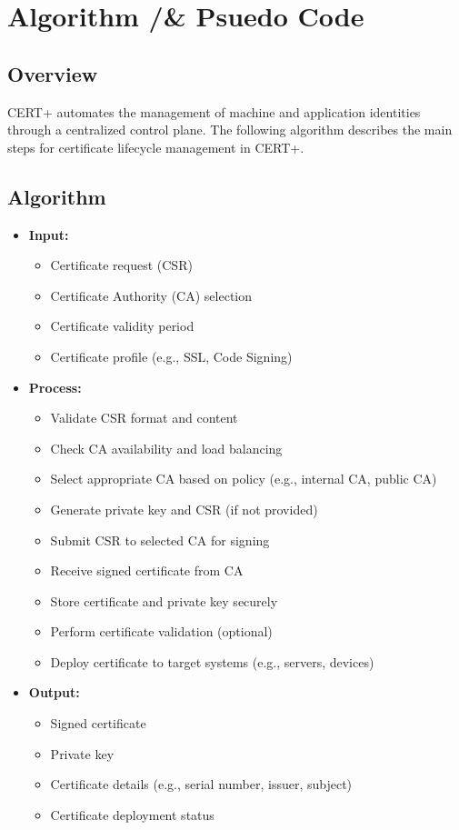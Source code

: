 \documentclass[10pt]{report}
\begin{document}
\Large
\section{Algorithm /& Psuedo Code}

\subsection{Overview}
CERT+ automates the management of machine and application identities through a centralized control plane. The following algorithm describes the main steps for certificate lifecycle management in CERT+.

\subsection*{Algorithm}
\begin{itemize}
  \item \textbf{ Input:}
  \begin{itemize}[label=--]
       \item Certificate request (CSR)
       \item Certificate Authority (CA) selection
       \item Certificate validity period
       \item Certificate profile (e.g., SSL, Code Signing)
  \end{itemize}

   \item\textbf{Process:}
    \begin{itemize}[label=--]
        \item Validate CSR format and content
        \item Check CA availability and load balancing
        \item Select appropriate CA based on policy (e.g., internal CA, public CA)
        \item Generate private key and CSR (if not provided)
        \item Submit CSR to selected CA for signing
        \item Receive signed certificate from CA
        \item Store certificate and private key securely
        \item Perform certificate validation (optional)
        \item Deploy certificate to target systems (e.g., servers, devices)
    \end{itemize}
    
    \item \textbf{Output:}
    \begin{itemize}[label=--]
        \item Signed certificate
        \item Private key
        \item Certificate details (e.g., serial number, issuer, subject)
        \item Certificate deployment status
    \end{itemize}
\end{itemize}
\end{document}
